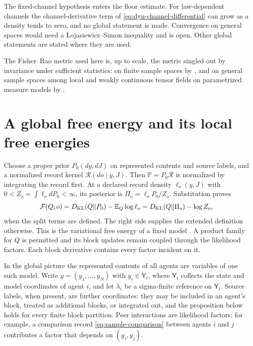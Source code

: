 The fixed-channel hypothesis enters the floor estimate. For law-dependent channels the channel-derivative term of \cref{eq:dyn-channel-differential} can grow as a density tends to zero, and no global statement is made. Convergence on general spaces would need a {\L}ojasiewicz--Simon inequality and is open. Other global statements are stated where they are used.

The Fisher--Rao metric used here is, up to scale, the metric singled out by invariance under sufficient statistics: on finite sample spaces by \citet{Cencov1982}, and on general sample spaces among local and weakly continuous tensor fields on parametrized measure models by \citet{AyJostLeSchwachhofer2015}.

\section{A global free energy and its local free energies}
\label{sec:dyn-likelihood}

Choose a proper prior $P_0(dy,dJ)$ on represented contents and source labels, and a normalized record kernel $\mathscr R(do\mid y,J)$. Then $\mathbb P=P_0\mathscr R$ is normalized by integrating the record first. At a declared record density $\ell_o(y,J)$ with $0<Z_o=\int\ell_o dP_0<\infty$, its posterior is $\Pi_o=\ell_o P_0/Z_o$. Substitution proves
\begin{equation}
 \mathcal F(Q;o)=D_{\mathrm{KL}}(Q\Vert P_0)-\mathbb E_Q\log\ell_o
 =D_{\mathrm{KL}}(Q\Vert\Pi_o)-\log Z_o,
 \label{eq:dyn-fixed-vfe}
\end{equation}
when the split terms are defined. The right side supplies the extended definition otherwise. This is the variational free energy of a fixed model \citep{NealHinton1998,JordanEtAl1999,Friston2010}. A product family for $Q$ is permitted and its block updates remain coupled through the likelihood factors. Each block derivative contains every factor incident on it.

In the global picture the represented contents of all agents are variables of one such model. Write $y=(y_1,\dots,y_N)$ with $y_i\in\mathsf Y_i$, where $\mathsf Y_i$ collects the state and model coordinates of agent $i$, and let $\lambda_i$ be a sigma-finite reference on $\mathsf Y_i$. Source labels, when present, are further coordinates: they may be included in an agent's block, treated as additional blocks, or integrated out, and the proposition below holds for every finite block partition. Peer interactions are likelihood factors: for example, a comparison record \cref{eq:sample-comparison} between agents $i$ and $j$ contributes a factor that depends on $(y_i,y_j)$.

